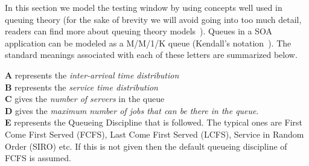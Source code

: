  
In this section we model the testing window by using concepts well used in queuing theory (for the sake of brevity we will avoid going into too much detail, readers can find more about queuing theory models~\cite{queueBook}).
Queues in a SOA application can be modeled as a M/M/1/K queue (Kendall's notation~\cite{kendall}).
The standard meanings associated with each of these letters are summarized below.\\

\begin{framed}
	\noindent \textbf{A} represents the \emph{inter-arrival time distribution}\\
	\textbf{B} represents the \emph{service time distribution}\\
	\textbf{C} gives the \emph{number of servers} in the queue\\
	\textbf{D} gives the \emph{maximum number of jobs that can be there in the queue}.\\
	\textbf{E} represents the Queueing Discipline that is followed. The typical ones are First Come First Served (FCFS), Last Come First Served (LCFS), Service in Random Order (SIRO) etc. If this is not given then the default queueing discipline of FCFS is assumed.
\end{framed}

